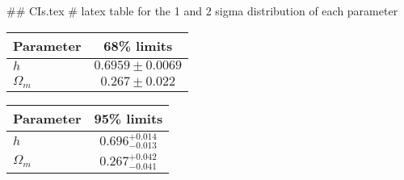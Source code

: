 ## CIs.tex
# latex table for the 1 and 2 sigma distribution of each parameter

\begin{tabular} { l  c}
 Parameter &  68\% limits\\
\hline
{\boldmath$h              $} & $0.6959\pm 0.0069          $\\
{\boldmath$\Omega_m       $} & $0.267\pm 0.022            $\\
\hline
\end{tabular}

\begin{tabular} { l  c}
 Parameter &  95\% limits\\
\hline
{\boldmath$h              $} & $0.696^{+0.014}_{-0.013}   $\\
{\boldmath$\Omega_m       $} & $0.267^{+0.042}_{-0.041}   $\\
\hline
\end{tabular}
